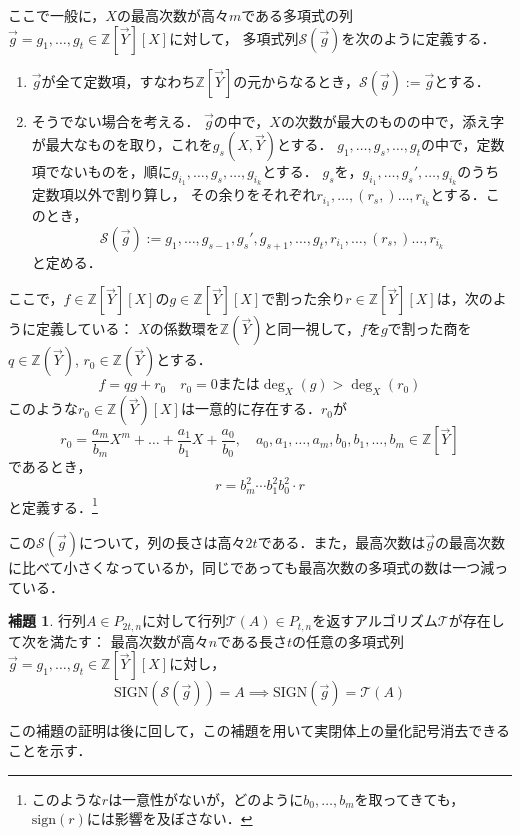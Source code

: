 \documentclass[uplatex, dvipdfmx]{jsarticle}
\newcommand{\sign}{\mathrm{sign}}
\newcommand{\SIGN}{\mathrm{SIGN}}
\newcommand{\Z}{\mathbb{Z}}
\theoremstyle{definition}
\newtheorem{lemma}{補題}[section]
\begin{document}
ここで一般に，$X$の最高次数が高々$m$である多項式の列
$\vec{g} = g_1, \dots, g_t \in \Z[\vec{Y}][X]$に対して，
多項式列$\mathcal{S}(\vec{g})$を次のように定義する．

\begin{enumerate}
    \item $\vec{g}$が全て定数項，すなわち$\Z[\vec{Y}]$の元からなるとき，$\mathcal{S}(\vec{g}):=\vec{g}$とする．
    \item そうでない場合を考える．
    $\vec{g}$の中で，$X$の次数が最大のものの中で，添え字が最大なものを取り，これを$g_s(X,\vec{Y})$とする．
    $g_1, \dots, g_s, \dots, g_t$の中で，定数項でないものを，順に$g_{i_1}, \dots, g_s, \dots, g_{i_k}$とする．
    $g_s$を，$g_{i_1}, \dots, g_s', \dots, g_{i_k}$のうち定数項以外で割り算し，
    その余りをそれぞれ$r_{i_1}, \dots, (r_s,)\dots, r_{i_k}$とする．このとき，
    \[
        \mathcal{S}(\vec{g}) := g_1, \dots, g_{s-1}, g_s',g_{s+1},\dots, g_t, r_{i_1}, \dots, (r_s,) \dots, r_{i_k}  
    \]
    と定める．
\end{enumerate}

ここで，$f \in \Z[\vec{Y}][X]$の$g \in \Z[\vec{Y}][X]$で割った余り$r \in \Z[\vec{Y}][X]$は，次のように定義している：
$X$の係数環を$\Z(\vec{Y})$と同一視して，$f$を$g$で割った商を$q \in \Z(\vec{Y})$, $r_0 \in \Z(\vec{Y})$とする．
\[ 
    f = q g + r_0 \quad \text{$r_0=0$または$\deg_X(g)>\deg_X(r_0)$}
\]
このような$r_0 \in \Z(\vec{Y})[X]$は一意的に存在する．$r_0$が
\[
    r_0 = \frac{a_m}{b_m} X^m + \dots +\frac{a_1}{b_1}X+ \frac{a_0}{b_0}, \quad a_0,a_1,\dots, a_m,b_0,b_1,\dots, b_m \in \Z[\vec{Y}]
\]
であるとき，
\[
    r = b_m^2 \cdots  b_1^2 b_0^2 \cdot r
\]
と定義する．\footnote{このような$r$は一意性がないが，どのように$b_0,\dots, b_m$を取ってきても，$\sign(r)$には影響を及ぼさない．}

この$\mathcal{S}(\vec{g})$について，列の長さは高々$2t$である．また，最高次数は$\vec{g}$の最高次数に比べて小さくなっているか，同じであっても最高次数の多項式の数は一つ減っている．

\begin{lemma} \label{main}
    行列$A \in P_{2t,n}$に対して行列$\mathcal{T}(A) \in P_{t,n}$を返すアルゴリズム$\mathcal{T}$が存在して次を満たす：
    最高次数が高々$n$である長さ$t$の任意の多項式列$\vec{g}=g_1, \dots, g_t \in \Z[\vec{Y}][X]$に対し，
    \[
        \SIGN(\mathcal{S}(\vec{g})) = A \implies \SIGN(\vec{g})=\mathcal{T}(A)
    \]
\end{lemma}
この補題の証明は後に回して，この補題を用いて実閉体上の量化記号消去できることを示す．
\end{document}
